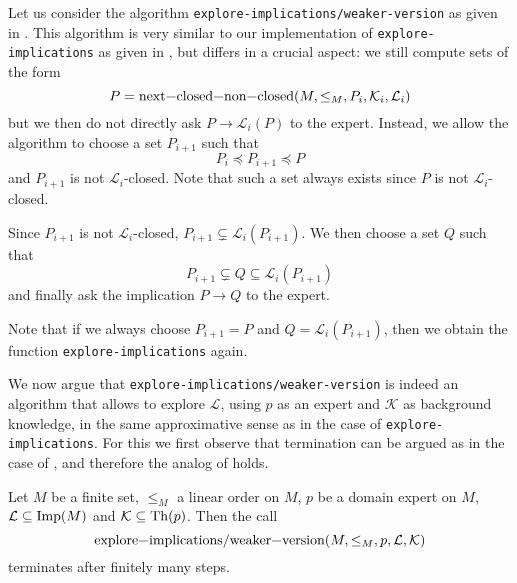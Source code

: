 Let us consider the algorithm \lstinline{explore-implications/weaker-version} as given in
.  This algorithm is very similar to our
implementation of \lstinline{explore-implications} as given in
, but differs in a crucial aspect:  we still compute sets
of the form
\begin{equation*}
  P = \text{\lstinline{next-closed-non-closed}}(M, \leq_{M}, P_{i}, \mathcal{K}_{i}, \mathcal{L}_{i})
\end{equation*}
but we then do not directly ask $P \to \mathcal{L}_{i}(P)$ to the expert.  Instead, we
allow the algorithm to choose a set $P_{i+1}$ such that
\begin{equation*}
  P_{i} \preceq P_{i+1} \preceq P
\end{equation*}
and $P_{i+1}$ is not $\mathcal{L}_{i}$-closed.  Note that such a set always exists since
$P$ is not $\mathcal{L}_{i}$-closed.

Since $P_{i+1}$ is not $\mathcal{L}_{i}$-closed, $P_{i+1} \subsetneq
\mathcal{L}_{i}(P_{i+1})$.  We then choose a set $Q$ such that
\begin{equation*}
  P_{i+1} \subsetneq Q \subseteq \mathcal{L}_{i}(P_{i+1})
\end{equation*}
and finally ask the implication $P \to Q$ to the expert.

Note that if we always choose $P_{i+1} = P$ and $Q = \mathcal{L}_{i}(P_{i+1})$, then we
obtain the function \lstinline{explore-implications} again.

We now argue that \lstinline{explore-implications/weaker-version} is indeed an algorithm
that allows to explore $\mathcal{L}$, using $p$ as an expert and $\mathcal{K}$ as
background knowledge, in the same approximative sense as in the case of
\lstinline{explore-implications}.  For this we first observe that termination can be
argued as in the case of , and therefore the analog of
 holds.

\begin{Theorem}
  \label{thm:explore-implications-weaker-version-termination}
  Let $M$ be a finite set, $\leq_{M}$ a linear order on $M$, $p$ be a domain expert on
  $M$, $\mathcal{L} \subseteq \operatorname{Imp}(M)$ and $\mathcal{K} \subseteq \operatorname{Th}(p)$.  Then the call
  \begin{equation*}
    \text{\lstinline{explore-implications/weaker-version}}(M, \leq_{M}, p, \mathcal{L}, \mathcal{K})
  \end{equation*}
  terminates after finitely many steps.
\end{Theorem}

